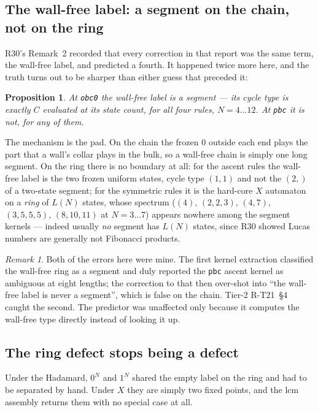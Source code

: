 \documentclass[11pt]{article}
\newcommand{\rt}[1]{\texttt{#1}}
\theoremstyle{plain}
\newtheorem{proposition}{Proposition}
\theoremstyle{remark}
\newtheorem{remark}{Remark}
\begin{document}
\subsection{The wall-free label: a segment on the chain, not on the ring}

R30's Remark~2 recorded that every correction in that report was the same term,
the wall-free label, and predicted a fourth. It happened twice more here, and the
truth turns out to be sharper than either guess that preceded it:

\begin{proposition}
At \rt{obc0} the wall-free label \emph{is} a segment --- its cycle type is exactly
$C$ evaluated at its state count, for all four rules, $N=4\ldots12$. At \rt{pbc}
it is not, for any of them.
\end{proposition}

\noindent The mechanism is the pad. On the chain the frozen $0$ outside each end
plays the part that a wall's collar plays in the bulk, so a wall-free chain is
simply one long segment. On the ring there is no boundary at all: for the ascent
rules the wall-free label is the two frozen uniform states, cycle type $(1,1)$ and
not the $(2,)$ of a two-state segment; for the symmetric rules it is the hard-core
$X$ automaton on a \emph{ring} of $L(N)$ states, whose spectrum
($(4)$, $(2,2,3)$, $(4,7)$, $(3,5,5,5)$, $(8,10,11)$ at $N=3\ldots7$) appears
nowhere among the segment kernels --- indeed usually \emph{no} segment has $L(N)$
states, since R30 showed Lucas numbers are generally not Fibonacci products.

\begin{remark}
Both of the errors here were mine. The first kernel extraction classified the
wall-free ring as a segment and duly reported the \rt{pbc} ascent kernel as
ambiguous at eight lengths; the correction to that then over-shot into ``the
wall-free label is never a segment'', which is false on the chain. Tier-2 R-T21~\S4
caught the second. The predictor was unaffected only because it computes the
wall-free type directly instead of looking it up.
\end{remark}

\subsection{The ring defect stops being a defect}

Under the Hadamard, $0^N$ and $1^N$ shared the empty label on the ring and had to
be separated by hand. Under $X$ they are simply two fixed points, and the lcm
assembly returns them with no special case at all.
\end{document}
